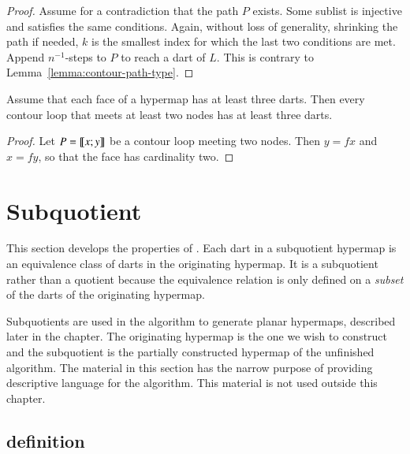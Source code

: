 
\begin{proof} Assume for a contradiction that the path $P$ exists.
Some sublist is injective and satisfies the same conditions.  Again,
without loss of generality, shrinking the path if needed, $k$ is the
smallest index for which the last two conditions are met.  Append
$n^{-1}$-steps to $P$ to reach a dart of $L$.  This is contrary to
Lemma~\ref{lemma:contour-path-type}.
\end{proof}

\begin{lemma}\cutrate{}\label{lemma:3dart}  
Assume that each face of a hypermap  has at least three darts.
Then every contour loop that meets at least two nodes has at least
three darts.
\end{lemma}

\begin{proof} Let $P={\llbracket{x;y}\rrbracket}$ be a contour loop meeting two nodes.  Then
$y = f x$ and $x = f y$, so that the face has cardinality two.
\end{proof}


\section{Subquotient}
%

This section develops the properties of .  Each dart in a subquotient hypermap is an equivalence
class of darts in the originating hypermap.  It is a subquotient
rather than a quotient because the equivalence relation
is only defined on a {\it subset} of the darts of the originating
hypermap. 

Subquotients are used in the algorithm to generate planar hypermaps, described
later in the chapter.  The
originating hypermap is the one we wish to construct and the subquotient
is the partially constructed hypermap of the unfinished algorithm.  The material
in this section has the narrow purpose  of providing descriptive language for the
algorithm.  This material  is not  used outside this chapter.

\subsection{definition}

